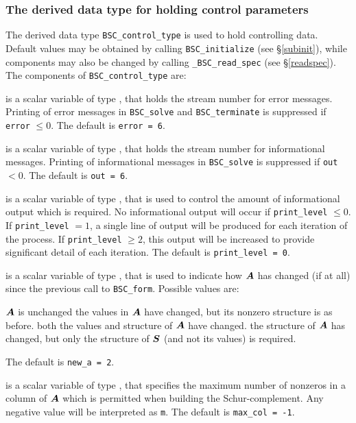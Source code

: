 \documentclass{galahad}
\newcommand{\packagename}{BSC}
\newcommand{\fullpackagename}{\libraryname\_\packagename}
\begin{document}

\subsubsection{The derived data type for holding control 
 parameters}\label{typecontrol}
The derived data type 
{\tt \packagename\_control\_type} 
is used to hold controlling data. Default values may be obtained by calling 
{\tt \packagename\_initialize}
(see \S\ref{subinit}),
while components may also be changed by calling 
{\tt \fullpackagename\_read\-\_spec}
(see \S\ref{readspec}). 
The components of 
{\tt \packagename\_control\_type} 
are:

\begin{description}

 is a scalar variable of type \integer, that holds the
stream number for error messages. Printing of error messages in 
{\tt \packagename\_solve} and {\tt \packagename\_terminate} 
is suppressed if {\tt error} $\leq 0$.
The default is {\tt error = 6}.

 is a scalar variable of type \integer, that holds the
stream number for informational messages. Printing of informational messages in 
{\tt \packagename\_solve} is suppressed if {\tt out} $< 0$.
The default is {\tt out = 6}.

 is a scalar variable of type \integer, that is used
to control the amount of informational output which is required. No 
informational output will occur if {\tt print\_level} $\leq 0$. If 
{\tt print\_level} $= 1$, a single line of output will be produced for each
iteration of the process. If {\tt print\_level} $\geq 2$, this output will be
increased to provide significant detail of each iteration.
The default is {\tt print\_level = 0}.

 is a scalar variable of type \integer, that is used
to indicate how ${\bm{A}}$ has changed (if at all) since the previous call
to {\tt BSC\_form}. Possible values are:
\begin{description}
 ${\bm{A}}$ is unchanged
 the values in ${\bm{A}}$ have changed, but its nonzero structure 
is as before.
 both the values and structure of ${\bm{A}}$ have changed.
 the structure of ${\bm{A}}$ has changed, but only the structure of
${\bm{S}}$ (and not its values) is required.
\end{description}
The default is {\tt new\_a = 2}.

 is a scalar variable of type \integer, that specifies
the maximum number of nonzeros in a column of ${\bm{A}}$ which is permitted
when building the Schur-complement. Any negative value will be interpreted
as {\tt m}.
The default is {\tt max\_col = -1}.


\end{description}
\end{document}

